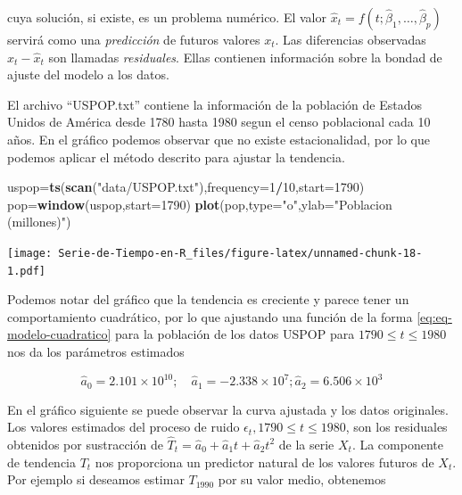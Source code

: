 \documentclass[12pt,]{krantz}
\makeatletter
\newenvironment{Shaded}{\begin{snugshade}}{\end{snugshade}}
\newcommand{\KeywordTok}[1]{\textcolor[rgb]{0.13,0.29,0.53}{\textbf{#1}}}
\newcommand{\DataTypeTok}[1]{\textcolor[rgb]{0.13,0.29,0.53}{#1}}
\newcommand{\DecValTok}[1]{\textcolor[rgb]{0.00,0.00,0.81}{#1}}
\newcommand{\StringTok}[1]{\textcolor[rgb]{0.31,0.60,0.02}{#1}}
\newcommand{\OperatorTok}[1]{\textcolor[rgb]{0.81,0.36,0.00}{\textbf{#1}}}
\newcommand{\NormalTok}[1]{#1}
\newenvironment{kframe}{%
\medskip{}
\setlength{\fboxsep}{.8em}
 \def\at@end@of@kframe{}%
 \ifinner\ifhmode%
  \def\at@end@of@kframe{\end{minipage}}%
  \begin{minipage}{\columnwidth}%
 \fi\fi%
 \def\FrameCommand##1{\hskip\@totalleftmargin \hskip-\fboxsep
 \colorbox{shadecolor}{##1}\hskip-\fboxsep
     \hskip-\linewidth \hskip-\@totalleftmargin \hskip\columnwidth}%
 \MakeFramed {\advance\hsize-\width
   \@totalleftmargin\z@ \linewidth\hsize
   \@setminipage}}%
 {\par\unskip\endMakeFramed%
 \at@end@of@kframe}
\renewenvironment{Shaded}{\begin{kframe}}{\end{kframe}}
\theoremstyle{definition}
\theoremstyle{definition}
\theoremstyle{definition}
\theoremstyle{remark}
\let\BeginKnitrBlock\begin \let\EndKnitrBlock\end
\makeatother
\begin{document}
cuya solución, si existe, es un problema numérico. El valor
\(\hat{x}_t=f(t;\hat{\beta}_1,\ldots,\hat{\beta}_p)\) servirá como una
\emph{predicción} de futuros valores \(x_t\). Las diferencias observadas
\(x_t-\hat{x}_t\) son llamadas \emph{residuales}. Ellas contienen
información sobre la bondad de ajuste del modelo a los datos.

\BeginKnitrBlock{example}
\protect\hypertarget{exm:ejem-poblacion-usa-metodo-T1}{}{\label{exm:ejem-poblacion-usa-metodo-T1}
}El archivo ``USPOP.txt'' contiene la información de la población de
Estados Unidos de América desde 1780 hasta 1980 segun el censo
poblacional cada 10 años. En el gráfico podemos observar que no existe
estacionalidad, por lo que podemos aplicar el método descrito para
ajustar la tendencia.
\EndKnitrBlock{example}

\begin{Shaded}
\begin{Highlighting}[]
\NormalTok{uspop=}\KeywordTok{ts}\NormalTok{(}\KeywordTok{scan}\NormalTok{(}\StringTok{"data/USPOP.txt"}\NormalTok{),}\DataTypeTok{frequency=}\DecValTok{1}\OperatorTok{/}\DecValTok{10}\NormalTok{,}\DataTypeTok{start=}\DecValTok{1790}\NormalTok{) }
\NormalTok{pop=}\KeywordTok{window}\NormalTok{(uspop,}\DataTypeTok{start=}\DecValTok{1790}\NormalTok{)}
\KeywordTok{plot}\NormalTok{(pop,}\DataTypeTok{type=}\StringTok{"o"}\NormalTok{,}\DataTypeTok{ylab=}\StringTok{"Poblacion (millones)"}\NormalTok{)}
\end{Highlighting}
\end{Shaded}

\texttt{[image: Serie-de-Tiempo-en-R\_files/figure-latex/unnamed-chunk-18-1.pdf]}

Podemos notar del gráfico que la tendencia es creciente y parece tener
un comportamiento cuadrático, por lo que ajustando una función de la
forma \eqref{eq:eq-modelo-cuadratico} para la población de los datos USPOP
para \(1790\leq t\leq1980\) nos da los parámetros estimados

\[\hat{a}_0=2.101\times10^{10};\quad \hat{a}_1=-2.338\times10^{7}; \hat{a}_2=6.506\times10^{3}\]

En el gráfico siguiente se puede observar la curva ajustada y los datos
originales. Los valores estimados del proceso de ruido
\(\epsilon_t, 1790\leq t\leq1980\), son los residuales obtenidos por
sustracción de \(\hat{T}_t=\hat{a}_0+\hat{a}_1t+\hat{a}_2t^2\) de la
serie \(X_t\). La componente de tendencia \(T_t\) nos proporciona un
predictor natural de los valores futuros de \(X_t\). Por ejemplo si
deseamos estimar \(T_{1990}\) por su valor medio, obtenemos
\end{document}
